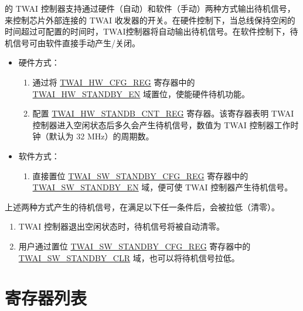 \documentclass[main\_\_CN.tex]{subfiles}
\begin{document}
\chipname{}的 TWAI 控制器支持通过硬件（自动）和软件（手动）两种方式输出待机信号，来控制芯片外部连接的 TWAI 收发器的开关。在硬件控制下，当总线保持空闲的时间超过可配置的时间时，TWAI控制器将自动输出待机信号。在软件控制下，待机信号可由软件直接手动产生/关闭。

\begin{itemize}
    \item 硬件方式：
    \begin{enumerate}
        \item 通过将 \hyperref[regdesc:TWAIHWCFGREG]{TWAI\_HW\_CFG\_REG} 寄存器中的 \hyperref[fielddesc:TWAIHWSTANDBYEN]{TWAI\_HW\_STANDBY\_EN} 域置位，使能硬件待机功能。
        \item 配置 \hyperref[regdesc:TWAIHWSTANDBYCNTREG]{TWAI\_HW\_STANDB\_CNT\_REG} 寄存器。该寄存器表明 TWAI 控制器进入空闲状态后多久会产生待机信号，数值为 TWAI 控制器工作时钟（默认为 32 MHz）的周期数。
    \end{enumerate}
    \item 软件方式：
    \begin{enumerate}
        \item 直接置位 \hyperref[regdesc:TWAISWSTANDBYCFGREG]{TWAI\_SW\_STANDBY\_CFG\_REG} 寄存器中的 \hyperref[fielddesc:TWAISWSTANDBYEN]{TWAI\_SW\_STANDBY\_EN} 域，便可使 TWAI 控制器产生待机信号。
    \end{enumerate}
\end{itemize}

上述两种方式产生的待机信号，在满足以下任一条件后，会被拉低（清零）。
\begin{enumerate}
    \item TWAI 控制器退出空闲状态时，待机信号将被自动清零。
    \item 用户通过置位 \hyperref[regdesc:TWAISWSTANDBYCFGREG]{TWAI\_SW\_STANDBY\_CFG\_REG} 寄存器中的 \hyperref[fielddesc:TWAISWSTANDBYCLR]{TWAI\_SW\_STANDBY\_CLR} 域，也可以将待机信号拉低。
\end{enumerate}



\clearpage
\section{寄存器列表}
\label{sec:twai-reg-summ}
\hypertarget{twai-reg-summ}{}
\end{document}
